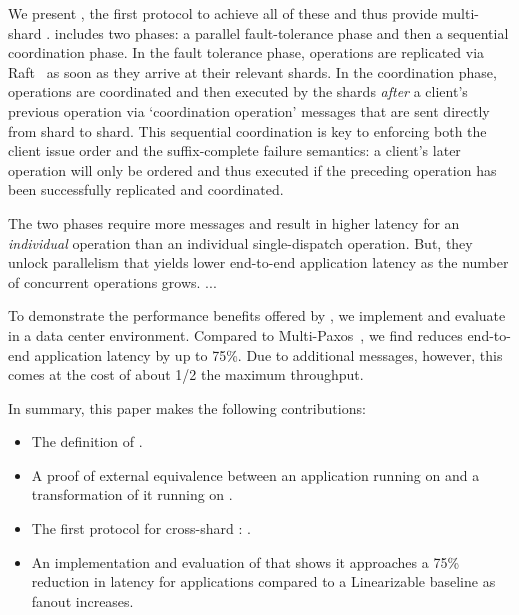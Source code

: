 We present \sys{}, the first protocol to achieve all of these and thus
provide multi-shard \mdl{}.
\sys{} includes two phases: a parallel fault-tolerance phase and then a sequential coordination phase.
In the fault tolerance phase, operations are replicated via Raft~\cite{ongaro2014raft} as soon as they arrive at their relevant shards.
In the coordination phase, operations are coordinated and then executed by the shards \textit{after} a client's previous operation via `coordination operation' messages that are sent directly from shard to shard.
This sequential coordination is key to enforcing both the client issue order and the suffix-complete failure semantics:
a client's later operation will only be ordered and thus executed if the preceding operation has been successfully replicated and coordinated.

The two phases require more messages and result in higher latency for an \textit{individual} operation than an individual single-dispatch operation.
But, they unlock parallelism that yields lower end-to-end application latency as the number of concurrent operations grows.
...

%



To demonstrate the performance benefits offered by \MDL{},
we implement and evaluate \sys{} in a data center environment.
Compared to Multi-Paxos~\cite{lamport1998paxos}, we find \sys{}
reduces end-to-end application latency by up to 75\%. Due to
additional messages, however, this comes at the cost of about 1/2 the
maximum throughput.

In summary, this paper makes the following contributions:
\begin{itemize}[leftmargin=*]
\item The definition of \mdllong{}.
\item A proof of external equivalence between an application running on \sdl{} and a transformation of it running on \mdl{}.
\item The first protocol for cross-shard \mdl{}: \sys{}.
\item An implementation and evaluation of \sys{} that shows it approaches a 75\% reduction in latency for applications compared to a Linearizable baseline as fanout increases.
\end{itemize}
